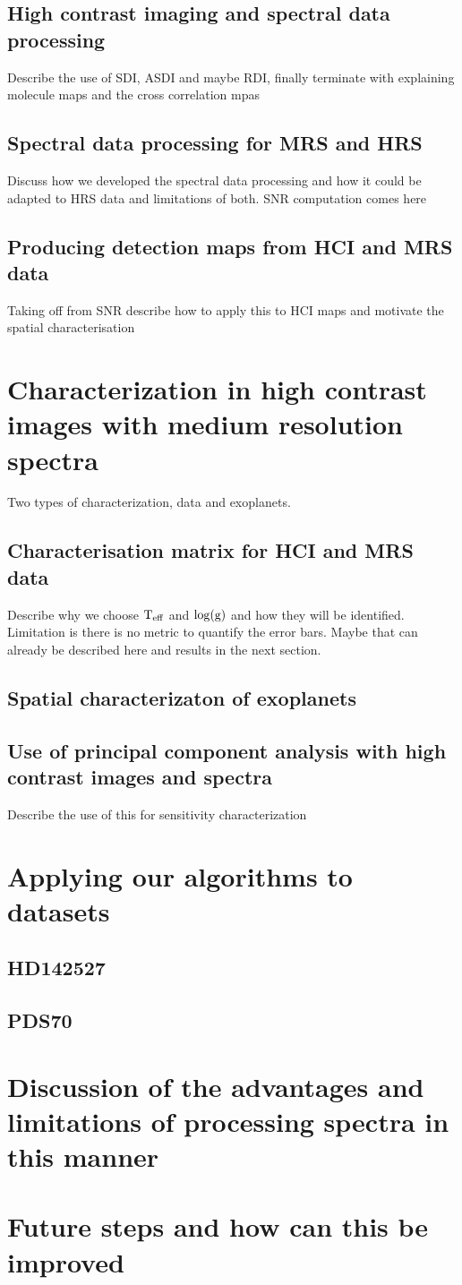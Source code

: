 \section{High contrast imaging and spectral data processing}
Describe the use of SDI, ASDI and maybe RDI, finally terminate with explaining molecule maps and the cross correlation mpas
\section{Spectral data processing for MRS and HRS}
Discuss how we developed the spectral data processing and how it could be adapted to HRS data and limitations of both.
SNR computation comes here
\section{Producing detection maps from HCI and MRS data}
Taking off from SNR describe how to apply this to HCI maps and motivate the spatial characterisation
\chapter{Characterization in high contrast images with medium resolution spectra}
Two types of characterization, data and exoplanets.
\section{Characterisation matrix for HCI and MRS data}
Describe why we choose $\rm{T_{eff}}$ and $\log(\rm{g})$ and how they will be identified. 
Limitation is there is no metric to quantify the error bars. Maybe that can already be described here and results in the next section.
\section{Spatial characterizaton of exoplanets}
\section{Use of principal component analysis with high contrast images and spectra}
Describe the use of this for sensitivity characterization

\chapter{Applying our algorithms to datasets}
\section{HD142527}
\section{PDS70}
\chapter{Discussion of the advantages and limitations of processing spectra in this manner}
\lipsum[1]

\chapter{Future steps and how can this be improved}